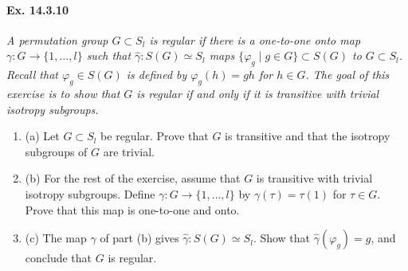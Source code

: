 \documentclass[11pt,a4paper]{article}
\newcommand{\be} {\begin{enumerate}}
\newcommand{\ee} {\end{enumerate}}
\begin{document}
  \paragraph{Ex. 14.3.10}{\it A permutation group $G \subset S_l$ is regular if there is a  one-to-one onto map $\gamma : G \to \{1,\ldots,l\}$ such that $\hat \gamma : S(G) \simeq S_l$ maps $\{\varphi_g \mid g \in G\} \subset S(G)$ to $G \subset S_l$. Recall that $\varphi_g \in S(G)$ is defined by $\varphi_g(h) = gh$ for $h\in G$. The goal of this exercise is to show that $G$ is regular if and only if it is transitive with trivial isotropy subgroups.
  \be
  \item[(a)] Let $G \subset S_l$ be regular. Prove that $G$ is transitive and that the isotropy subgroups of $G$ are trivial.
  \item[(b)] For the rest of the exercise, assume that $G$ is transitive with trivial isotropy subgroups. Define $\gamma : G \to \{1,\ldots,l\}$ by $\gamma(\tau) = \tau(1)$ for $\tau \in G$. Prove that this map is one-to-one and onto.
  \item[(c)] The map $\gamma$ of part (b) gives $\hat \gamma:S(G) \simeq S_l$. Show that $\hat \gamma(\varphi_g) = g$, and conclude that $G$ is regular.
  \ee
  }
\end{document}

